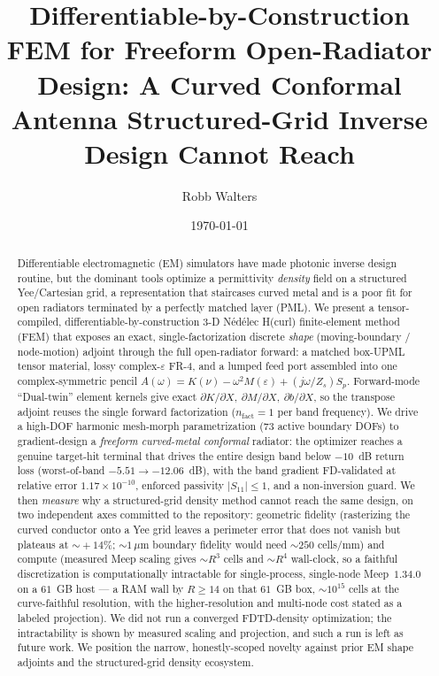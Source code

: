 \documentclass{anvil-paper}
\title{Differentiable-by-Construction FEM for Freeform Open-Radiator Design:
A Curved Conformal Antenna Structured-Grid Inverse Design Cannot Reach}
\author{Robb Walters}
\date{\today}
\begin{document}
\maketitle

\begin{abstract}
Differentiable electromagnetic (EM) simulators have made photonic inverse
design routine, but the dominant tools optimize a permittivity \emph{density}
field on a structured Yee/Cartesian grid, a representation that staircases
curved metal and is a poor fit for open radiators terminated by a perfectly
matched layer (PML). We present a tensor-compiled, differentiable-by-construction
3-D N\'ed\'elec H(curl) finite-element method (FEM) that exposes an exact,
single-factorization discrete \emph{shape} (moving-boundary / node-motion)
adjoint through the full open-radiator forward: a matched box-UPML tensor
material, lossy complex-$\varepsilon$ FR-4, and a lumped feed port assembled into
one complex-symmetric pencil $A(\omega)=K(\nu)-\omega^2 M(\varepsilon)+(j\omega/Z_s)S_p$.
Forward-mode ``Dual-twin'' element kernels give exact
$\partial K/\partial X,\ \partial M/\partial X,\ \partial b/\partial X$, so the
transpose adjoint reuses the single forward factorization
($n_{\text{fact}}=1$ per band frequency). We drive a high-DOF harmonic
mesh-morph parametrization (73 active boundary DOFs) to gradient-design a
\emph{freeform curved-metal conformal} radiator: the optimizer reaches a genuine
target-hit terminal that drives the entire design band below $-10$~dB return
loss (worst-of-band $-5.51 \to -12.06$~dB), with the band gradient FD-validated
at relative error $1.17\times10^{-10}$, enforced passivity $|S_{11}|\le1$, and a
non-inversion guard. We then \emph{measure} why a structured-grid density method
cannot reach the same design, on two independent axes committed to the
repository: geometric fidelity (rasterizing the curved conductor onto a Yee grid
leaves a perimeter error that does not vanish but plateaus at $\sim\!+14\%$;
$\sim\!1\,\mu$m boundary fidelity would need $\sim\!250$ cells/mm) and compute
(measured Meep scaling gives $\sim\!R^3$ cells and $\sim\!R^4$ wall-clock, so a
faithful discretization is computationally intractable for single-process,
single-node Meep~$1.34.0$ on a $61$~GB host --- a RAM wall by
$R\!\ge\!14$ on that $61$~GB box, $\sim\!10^{15}$ cells at the curve-faithful
resolution, with the higher-resolution and multi-node cost stated as a labeled
projection). We did not run a converged FDTD-density optimization; the
intractability is shown by measured scaling and projection, and such a run is
left as future work. We position the narrow, honestly-scoped novelty against
prior EM shape adjoints and the structured-grid density ecosystem.
\end{abstract}
\end{document}
